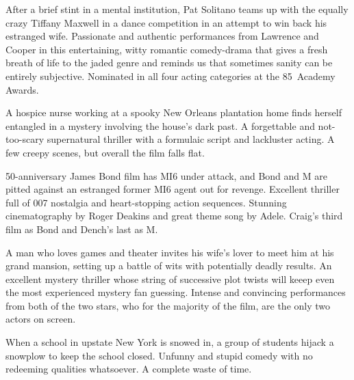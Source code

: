    After a brief stint in a mental institution, Pat Solitano teams up with the equally crazy Tiffany Maxwell in a dance competition in an attempt to win back his estranged wife. Passionate and authentic performances from Lawrence and Cooper in this entertaining, witty romantic comedy-drama that gives a fresh breath of life to the jaded genre and reminds us that sometimes sanity can be entirely subjective. Nominated in all four acting categories at the 85\th\ Academy Awards. \author{DW} 

   A hospice nurse working at a spooky New Orleans plantation home finds herself entangled in a mystery involving the house's dark past. A forgettable and not-too-scary supernatural thriller with a formulaic script and lackluster acting. A few creepy scenes, but overall the film falls flat. \author{DW} 

   50\th-anniversary James Bond film has MI6 under attack, and Bond and M are pitted against an estranged former MI6 agent out for revenge. Excellent thriller full of 007 nostalgia and heart-stopping action sequences. Stunning cinematography by Roger Deakins and great theme song by Adele. Craig's third film as Bond and Dench's last as M\@. \author{DW} 

   A man who loves games and theater invites his wife's lover to meet him at his grand mansion, setting up a battle of wits with potentially deadly results. An excellent mystery thriller whose string of successive plot twists will keeep even the most experienced mystery fan guessing. Intense and convincing performances from both of the two stars, who for the majority of the film, are the only two actors on screen. \author{DW} 

   When a school in upstate New York is snowed in, a group of students hijack a snowplow to keep the school closed. Unfunny and stupid comedy with no redeeming qualities whatsoever. A complete waste of time. \author{DW} 

